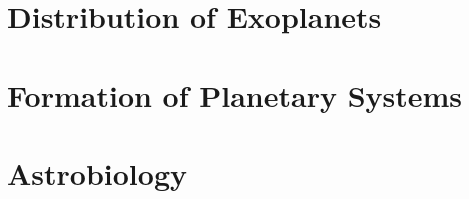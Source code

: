 \documentclass{momento}
\begin{document}
\onecolumn
\chapter{Distribution of Exoplanets}
\label{cha:distr-exopl}

\twocolumn

\chapter{Formation of Planetary Systems}
\label{cha:form-plan-syst}


\chapter{Astrobiology}
\label{cha:astrobiology}



\appendices




\nocite{*}
\end{document}
